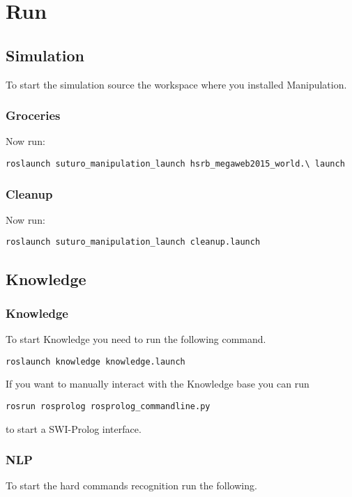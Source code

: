 \documentclass[main.tex]{subfiles}
\begin{document}
	\section{Run}
	\subsection{Simulation}
	To start the simulation source the workspace where you installed Manipulation.
	\subsubsection{Groceries}
	Now run:\\
	\begin{lstlisting}
roslaunch suturo_manipulation_launch hsrb_megaweb2015_world.\ launch
\end{lstlisting}

	\subsubsection{Cleanup}
	Now run:\\
	\begin{lstlisting}
roslaunch suturo_manipulation_launch cleanup.launch
\end{lstlisting}

	\subsection{Knowledge}
	\subsubsection{Knowledge}
	To start Knowledge you need to run the following command.\\
	\begin{lstlisting}
roslaunch knowledge knowledge.launch
\end{lstlisting}
If you want to manually interact with the Knowledge base you can run \\
\begin{lstlisting}
rosrun rosprolog rosprolog_commandline.py
\end{lstlisting}
to start a SWI-Prolog interface.
	
	\subsubsection{NLP}
	
	To start the hard commands recognition run the following.\\
	
\end{document}
